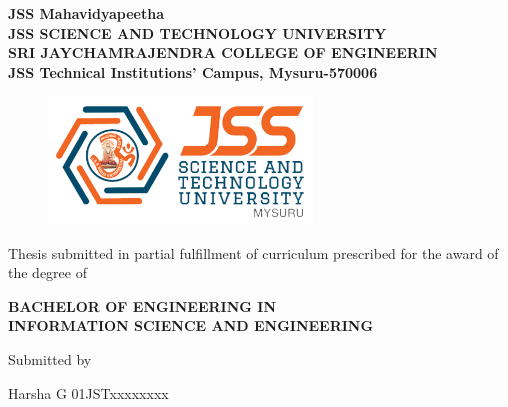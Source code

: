 \thispagestyle{empty}


\begin{center}
    { \large {\bfseries{
    JSS Mahavidyapeetha \\
    JSS SCIENCE AND TECHNOLOGY UNIVERSITY \\
    SRI JAYCHAMRAJENDRA COLLEGE OF ENGINEERIN\\
    JSS Technical Institutions’ Campus, Mysuru-570006} \par}}
    
    \vspace{1.5\baselineskip}
    {\begin{figure}[!h] 
	\centering
	\includegraphics[width=70mm]{images/JSSSTU.png} 
     \end{figure}
    }

\vspace{0.5\baselineskip}
       {\bf\large \MakeUppercase{\mytitle} \par}

\vspace{1.5\baselineskip}
    {\large{Thesis submitted in partial fulfillment of curriculum prescribed for the award of the degree of} \par}
\vspace{0.5\baselineskip}
    {\large\textbf{BACHELOR OF ENGINEERING IN \\ INFORMATION SCIENCE AND ENGINEERING }\par}

\vspace{1\baselineskip}
    {{Submitted by} \par}

\vspace{\baselineskip}
    {\large {\quad Harsha G\hspace{2.7cm} 01JSTxxxxxxxx}  \par}

\vspace{2 \baselineskip}
    {\bf\MakeUppercase{\mydep} \par}
    {\bf\myyear}
\end{center}
